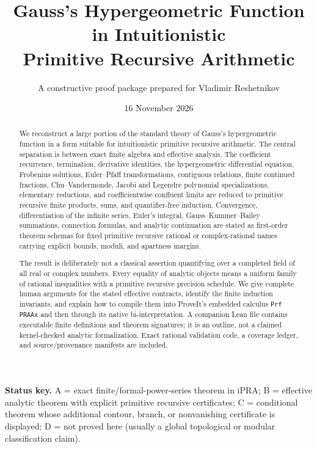 \documentclass[11pt]{article}
\title{Gauss's Hypergeometric Function in Intuitionistic\\
Primitive Recursive Arithmetic}
\author{A constructive proof package prepared for Vladimir Reshetnikov}
\date{16 November 2026}
\theoremstyle{definition}
\theoremstyle{remark}
\newcommand{\code}[1]{\texttt{#1}}
\newcommand{\StatusA}{\textsf{A}}
\newcommand{\StatusB}{\textsf{B}}
\newcommand{\StatusC}{\textsf{C}}
\newcommand{\StatusD}{\textsf{D}}
\begin{document}
\maketitle

\begin{abstract}
We reconstruct a large portion of the standard theory of Gauss's
hypergeometric function in a form suitable for intuitionistic primitive
recursive arithmetic.  The central separation is between exact finite
algebra and effective analysis.  The coefficient recurrence, termination,
derivative identities, the hypergeometric differential equation, Frobenius
solutions, Euler--Pfaff transformations, contiguous relations, finite
continued fractions, Chu--Vandermonde, Jacobi and Legendre polynomial
specializations, elementary reductions, and coefficientwise confluent limits
are reduced to primitive recursive finite products, sums, and
quantifier-free induction.  Convergence, differentiation of the infinite
series, Euler's integral, Gauss--Kummer--Bailey summations, connection
formulas, and analytic continuation are stated as first-order theorem schemas
for fixed primitive recursive rational or complex-rational names carrying
explicit bounds, moduli, and apartness margins.

The result is deliberately not a classical assertion quantifying over a
completed field of all real or complex numbers.  Every equality of analytic
objects means a uniform family of rational inequalities with a primitive
recursive precision schedule.  We give complete human arguments for the
stated effective contracts, identify the finite induction invariants, and
explain how to compile them into ProveIt's embedded calculus
\code{Prf PRAAx} and then through its native bi-interpretation.  A companion
Lean file contains executable finite definitions and theorem signatures; it
is an outline, not a claimed kernel-checked analytic formalization.  Exact
rational validation code, a coverage ledger, and source/provenance manifests
are included.
\end{abstract}

\medskip
\noindent\textbf{Status key.}
\StatusA{} = exact finite/formal-power-series theorem in iPRA;
\StatusB{} = effective analytic theorem with explicit primitive recursive
certificates;
\StatusC{} = conditional theorem whose additional contour, branch, or
nonvanishing certificate is displayed;
\StatusD{} = not proved here (usually a global topological or modular
classification claim).

\newpage
\begingroup\small\tableofcontents\endgroup
\newpage
\end{document}
